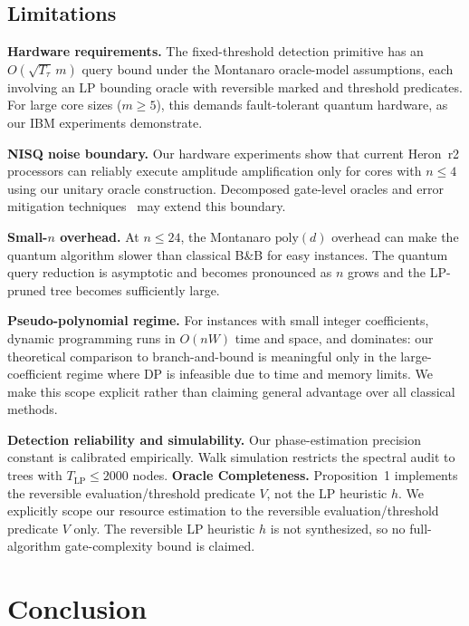 \documentclass[conference]{IEEEtran} \IEEEoverridecommandlockouts
\begin{document}
\subsection{Limitations}

\textbf{Hardware requirements.} The fixed-threshold detection primitive has an $O(\sqrt{T_{\tau}}\,m)$ query bound under the Montanaro oracle-model assumptions, each involving an LP bounding oracle with reversible marked and threshold predicates. For large core sizes ($m \geq 5$), this demands fault-tolerant quantum hardware, as our IBM experiments demonstrate.

\textbf{NISQ noise boundary.} Our hardware experiments show that current Heron~r2 processors can reliably execute amplitude amplification only for cores with $n \leq 4$ using our unitary oracle construction. Decomposed gate-level oracles and error mitigation techniques~\cite{ref31} may extend this boundary.

\textbf{Small-$n$ overhead.} At $n \leq 24$, the Montanaro $\text{poly}(d)$ overhead can make the quantum algorithm slower than classical B\&B for easy instances. The quantum query reduction is asymptotic and becomes pronounced as $n$ grows and the LP-pruned tree becomes sufficiently large.

\textbf{Pseudo-polynomial regime.} For instances with small integer coefficients, dynamic programming runs in $O(nW)$ time and space, and dominates: our theoretical comparison to branch-and-bound is meaningful only in the large-coefficient regime where DP is infeasible due to time and memory limits. We make this scope explicit rather than claiming general advantage over all classical methods.

\textbf{Detection reliability and simulability.} Our phase-estimation precision constant is calibrated empirically. Walk simulation restricts the spectral audit to trees with $T_{\text{LP}} \le 2000$ nodes. \textbf{Oracle Completeness.} Proposition~1 implements the reversible evaluation/threshold predicate $V$, not the LP heuristic $h$. We explicitly scope our resource estimation to the reversible evaluation/threshold predicate $V$ only. The reversible LP heuristic $h$ is not synthesized, so no full-algorithm gate-complexity bound is claimed.




\section{Conclusion}
\end{document}
